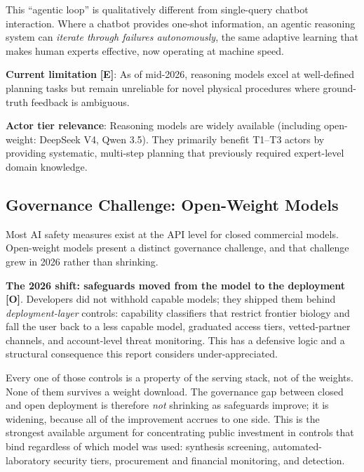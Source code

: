 \documentclass[11pt,letterpaper]{article}
\begin{document}
This ``agentic loop'' is qualitatively different from single-query chatbot interaction. Where a chatbot provides one-shot information, an agentic reasoning system can \textit{iterate through failures autonomously}, the same adaptive learning that makes human experts effective, now operating at machine speed.

\textbf{Current limitation} \textbf{[E]}: As of mid-2026, reasoning models excel at well-defined planning tasks but remain unreliable for novel physical procedures where ground-truth feedback is ambiguous.

\textbf{Actor tier relevance}: Reasoning models are widely available (including open-weight: DeepSeek V4, Qwen 3.5). They primarily benefit T1--T3 actors by providing systematic, multi-step planning that previously required expert-level domain knowledge.

\subsection{Governance Challenge: Open-Weight Models}

Most AI safety measures exist at the API level for closed commercial models. Open-weight models present a distinct governance challenge, and that challenge grew in 2026 rather than shrinking.

\textbf{The 2026 shift: safeguards moved from the model to the deployment} \textbf{[O]}. Developers did not withhold capable models; they shipped them behind \textit{deployment-layer} controls: capability classifiers that restrict frontier biology and fall the user back to a less capable model, graduated access tiers, vetted-partner channels, and account-level threat monitoring. This has a defensive logic and a structural consequence this report considers under-appreciated.

\begin{keybox}
Every one of those controls is a property of the serving stack, not of the weights. None of them survives a weight download. The governance gap between closed and open deployment is therefore \textit{not} shrinking as safeguards improve; it is widening, because all of the improvement accrues to one side. This is the strongest available argument for concentrating public investment in controls that bind regardless of which model was used: synthesis screening, automated-laboratory security tiers, procurement and financial monitoring, and detection.
\end{keybox}
\end{document}
